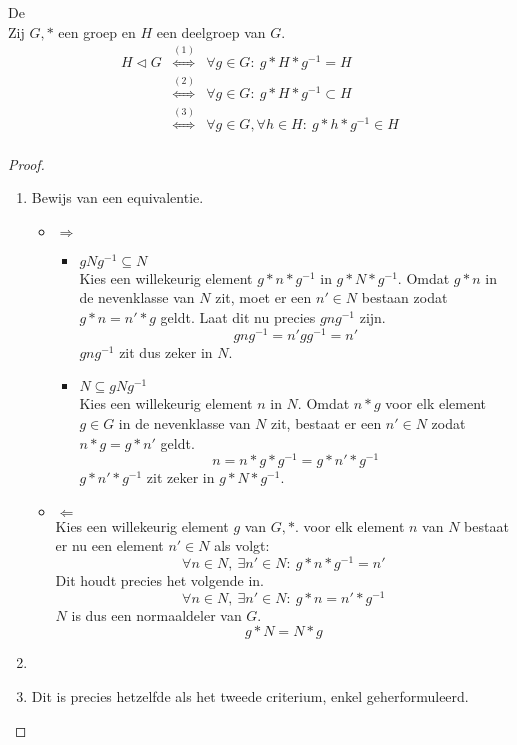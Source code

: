 \documentclass[main.tex]{subfiles}
\begin{document}
\begin{st}
  \label{st:criteria-voor-normaaldeler}
  De \\
  Zij $G,*$ een groep en $H$ een deelgroep van $G$.
  \[
  \begin{array}{rcl}
    H \triangleleft G &\overset{(1)}{\Leftrightarrow} & \forall g \in G:\ g*H*g^{-1} = H\\
                      &\overset{(2)}{\Leftrightarrow} & \forall g \in G:\ g*H*g^{-1} \subset H\\
                      &\overset{(3)}{\Leftrightarrow} & \forall g \in G,\forall h \in H:\ g*h*g^{-1} \in H\\
  \end{array}
  \]

  \begin{proof}
    \begin{enumerate}
    \item Bewijs van een equivalentie.
      \begin{itemize}
      \item $\Rightarrow$\\
        \begin{itemize}
        \item $gNg^{-1}\subseteq N$\\
          Kies een willekeurig element $g*n*g^{-1}$ in $g*N*g^{-1}$.
          Omdat $g*n$ in de nevenklasse van $N$ zit, moet er een $n'\in N$ bestaan zodat $g*n =n'*g$ geldt.
          Laat dit nu precies $gng^{-1}$ zijn.
          \[ gng^{-1} = n'gg^{-1} = n' \]
          $gng^{-1}$ zit dus zeker in $N$.\\
        \item $N \subseteq gNg^{-1}$\\
          Kies een willekeurig element $n$ in $N$.
          Omdat $n*g$ voor elk element $g\in G$ in de nevenklasse van $N$ zit, bestaat er een $n'\in N$ zodat $n*g = g*n'$ geldt.
          \[ n = n * g * g^{-1} = g*n'*g^{-1}\]
          $g*n'*g^{-1}$ zit zeker in $g*N*g^{-1}$.
        \end{itemize}
      \item $\Leftarrow$\\
        Kies een willekeurig element $g$ van $G,*$. voor elk element $n$ van $N$ bestaat er nu een element $n'\in N$ als volgt:
        \[ \forall n\in N,\ \exists n'\in N:\ g*n*g^{-1} =n' \]
        Dit houdt precies het volgende in.
        \[ \forall n\in N,\ \exists n'\in N:\ g*n=n'*g^{-1} \]
        $N$ is dus een normaaldeler van $G$.
        \[ g*N = N*g \]
      \end{itemize}

    \item {}
    \item Dit is precies hetzelfde als het tweede criterium, enkel geherformuleerd.
    \end{enumerate}
  \end{proof}
\end{st}
\end{document}
